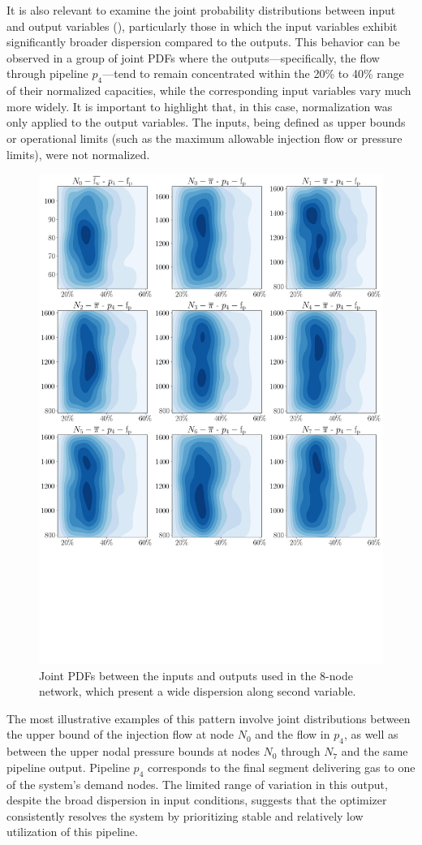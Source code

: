 It is also relevant to examine the joint probability distributions between input and output variables (), particularly those in which the input variables exhibit significantly broader dispersion compared to the outputs. This behavior can be observed in a group of joint PDFs where the outputs—specifically, the flow through pipeline $p_4$—tend to remain concentrated within the 20\% to 40\% range of their normalized capacities, while the corresponding input variables vary much more widely. It is important to highlight that, in this case, normalization was only applied to the output variables. The inputs, being defined as upper bounds or operational limits (such as the maximum allowable injection flow or pressure limits), were not normalized. 

\begin{figure}[htbp]
    \begin{center}
        \includegraphics[width=.65\textwidth]{figures/Chapter_NonLinealCensnet/inputs_outputs_1.png}
    \end{center}
    \caption{Joint PDFs between the inputs and outputs used in the 8-node network, which present a wide dispersion along second variable. }
    \label{fig:joint_distributions_inputs_outputs_1}
\end{figure}


The most illustrative examples of this pattern involve joint distributions between the upper bound of the injection flow at node $N_0$ and the flow in $p_4$, as well as between the upper nodal pressure bounds at nodes $N_0$ through $N_7$ and the same pipeline output. Pipeline $p_4$ corresponds to the final segment delivering gas to one of the system’s demand nodes. The limited range of variation in this output, despite the broad dispersion in input conditions, suggests that the optimizer consistently resolves the system by prioritizing stable and relatively low utilization of this pipeline. 



